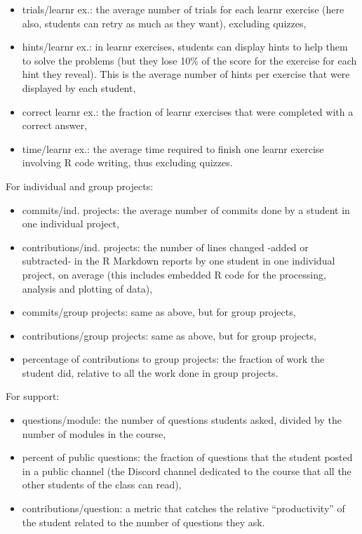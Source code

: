 \documentclass{aims}
\theoremstyle{definition}
\begin{document}
\begin{itemize}
\item
  trials/learnr ex.: the average number of trials for each learnr
  exercise (here also, students can retry as much as they want),
  excluding quizzes,
\item
  hints/learnr ex.: in learnr exercises, students can display hints to
  help them to solve the problems (but they lose 10\% of the score for
  the exercise for each hint they reveal). This is the average number of
  hints per exercise that were displayed by each student,
\item
  correct learnr ex.: the fraction of learnr exercises that were
  completed with a correct answer,
\item
  time/learnr ex.: the average time required to finish one learnr
  exercise involving R code writing, thus excluding quizzes.
\end{itemize}

For individual and group projects:

\begin{itemize}
\item
  commits/ind. projects: the average number of commits done by a student
  in one individual project,
\item
  contributions/ind. projects: the number of lines changed -added or
  subtracted- in the R Markdown reports by one student in one individual
  project, on average (this includes embedded R code for the processing,
  analysis and plotting of data),
\item
  commits/group projects: same as above, but for group projects,
\item
  contributions/group projects: same as above, but for group projects,
\item
  percentage of contributions to group projects: the fraction of work
  the student did, relative to all the work done in group projects.
\end{itemize}

For support:

\begin{itemize}
\item
  questions/module: the number of questions students asked, divided by
  the number of modules in the course,
\item
  percent of public questions: the fraction of questions that the
  student posted in a public channel (the Discord channel dedicated to
  the course that all the other students of the class can read),
\item
  contributions/question: a metric that catches the relative
  ``productivity'' of the student related to the number of questions
  they ask.
\end{itemize}
\end{document}
